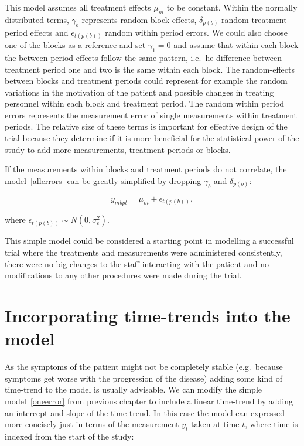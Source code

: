 \documentclass[12pt,a4paper,leqno]{report}
\theoremstyle{plain}
\theoremstyle{definition}
\theoremstyle{remark}
\begin{document}
This model assumes all treatment effects \(\mu_m\) to be constant. Within the
normally distributed terms, \(\gamma_b\) represents random block-effects,
\(\delta_{p(b)}\) random treatment period effects and \(\epsilon_{t(p(b))}\) random within
period errors. We could also choose one of the blocks as a reference and set
\(\gamma_1 = 0\) and assume that within each block the between period effects
follow the same pattern, i.e.\ he difference between treatment period one and
two is the same within each block. The random-effects between blocks and treatment
periods could represent for example the random variations in the motivation of the patient and possible
changes in treating personnel within each block and treatment period. The random
within period errors represents the measurement error of single measurements
within treatment periods. The relative size of these terms is important
for effective design of the trial because they determine if it is more
beneficial for the statistical power of the study to add more measurements,
treatment periods or blocks.

If the measurements within blocks and treatment periods do not correlate, the
model\ \ref{allerrors} can be greatly simplified by dropping \(\gamma_b\) and
\(\delta_{p(b)}\):

\begin{def}\label{}
    \begin{equation}\label{oneerror}
        y_{mbpt} = \mu_m + \epsilon_{t(p(b))},
    \end{equation}
\end{def}where \(\epsilon_{t(p(b))} \sim N(0,\sigma^2_{\epsilon})\).

This simple model could be considered a starting point in modelling a successful trial where
the treatments and measurements were administered consistently, there were no big changes to the staff interacting
with the patient and no modifications to any other procedures were made during
the trial.

\section{Incorporating time-trends into the model}\label{timetrends}

As the symptoms of the patient might not be completely stable (e.g.\ because
symptoms get worse with the progression of the disease) adding some kind of
time-trend to the model is usually advisable. We can modify the simple model\ \ref{oneerror} from previous chapter to include a linear time-trend by adding an
intercept and slope of the time-trend. In this case the model can expressed more
concisely just in terms of the measurement \(y_t\) taken at time \(t\), where
time is indexed from the start of the study:
\end{document}

